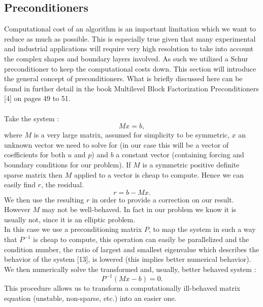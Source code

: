 \documentclass[11pt,twoside,a4paper]{article}
\begin{document}
\subsection{Preconditioners}
Computational cost of an algorithm is an important limitation which we want to reduce as much as possible. This is especially true given that many experimental and industrial applications will require very high resolution to take into account the complex shapes and boundary layers involved. As such we utilized a Schur preconditioner to keep the computational costs down. This section will introduce the general concept of preconditioners. What is briefly discussed here can be found in further detail in the book Multilevel Block Factorization Preconditioners [4] on pages 49 to 51.\\
\\
Take the system :\\
$$
Mx = b ,
$$
where $M$ is a very large matrix, assumed for simplicity to be symmetric, $x$ an unknown vector we need to solve for (in our case this will be a vector of coefficients for both $u$ and $p$) and $b$ a constant vector (containing forcing and boundary conditions for our problem). If $M$ is a symmetric positive definite sparse matrix then $M$ applied to a vector is cheap to compute. Hence we can easily find $r$, the residual.\\
$$
r = b - Mx .
$$
We then use the resulting $r$ in order to provide a correction on our result.\\
However $M$ may not be well-behaved. In fact in our problem we know it is usually not, since it is an elliptic problem.\\
In this case we use a preconditioning matrix $P$, to map the system in such a way that $P^{-1}$ is cheap to compute, this operation can easily be parallelized and the condition number, the ratio of largest and smallest eigenvalue which describes the behavior of the system [13], is lowered (this implies better numerical behavior).\\
We then numerically solve the transformed and, usually, better behaved system :
$$
P^{-1}(Mx-b) = 0 .
$$
This procedure allows us to transform a computationally ill-behaved matrix equation (unstable, non-sparse, etc.) into an easier one.
\end{document}
